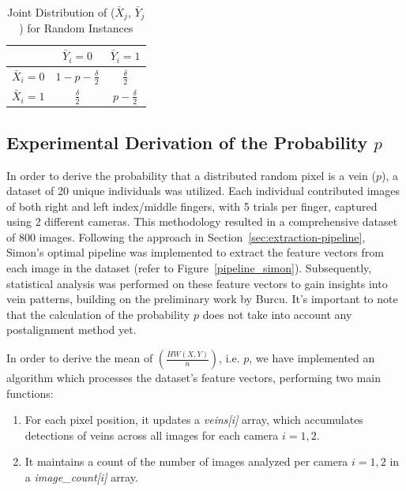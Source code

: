 \begin{table}[H]
    \centering
    \renewcommand{\arraystretch}{1.5}
    \begin{tabular}{|c|c|c|}
        \hline
        & $\bar{Y}_i = 0$ & $\bar{Y}_i = 1$\\
        \hline
        $\bar{X}_i = 0$ & $1 - p - \frac{\delta}{2}$ & $\frac{\delta}{2}$\\
        \hline
        $\bar{X}_i = 1$ & $\frac{\delta}{2}$ & $p - \frac{\delta}{2}$\\
        \hline
    \end{tabular}
    \caption{Joint Distribution of ($\bar{X}_j$, $\bar{Y}_j$) for Random Instances}
    \label{tab:joint_distribution}
\end{table}



\subsection{Experimental Derivation of the Probability \(p\)}
\label{sec:p}
In order to derive the probability that a distributed random pixel is a vein (\(p\)), a dataset of 20 unique individuals was utilized. Each individual contributed images of both right and left index/middle fingers, with 5 trials per finger, captured using 2 different cameras. This methodology resulted in a comprehensive dataset of 800 images. Following the approach in Section~\ref{sec:extraction-pipeline}, Simon's optimal pipeline was implemented to extract the feature vectors from each image in the dataset (refer to Figure~\ref{pipeline_simon}). Subsequently, statistical analysis was performed on these feature vectors to gain insights into vein patterns, building on the preliminary work by Burcu. It's important to note that the calculation of the probability \(p\) does not take into account any postalignment method yet.

In order to derive the mean of \(\left( \frac{HW(X, Y)}{n} \right)\), i.e. \(p\), we have implemented an algorithm which processes the dataset's feature vectors, performing two main functions:
\begin{enumerate}
    \item For each pixel position, it updates a \textit{veins[i]} array, which accumulates detections of veins across all images for each camera \(i={1,2}\).
    \item It maintains a count of the number of images analyzed per camera \(i={1,2}\) in a \textit{image\_count[i]} array.
\end{enumerate}

